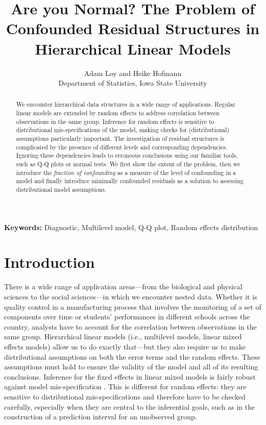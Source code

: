 \documentclass[12pt]{article} %
\title{Are you Normal? The Problem of Confounded Residual Structures in Hierarchical Linear Models}
\author{
	Adam Loy and Heike Hofmann\\
	Department of Statistics,
	Iowa State University
}
\newcommand{\hh}[1]{{\color{orange} #1}}
\newcommand{\al}[1]{{\color{red} #1}}
\begin{document}
\maketitle


\begin{abstract}
We encounter hierarchical data structures in a wide range of applications. Regular linear models are extended by random effects to address correlation between observations in the same group. Inference for random effects is sensitive to  distributional mis-specifications of the model, making checks for (distributional) assumptions particularly important.  The investigation of residual structures is complicated by the presence of  different levels and corresponding  dependencies. Ignoring these dependencies leads to  erroneous conclusions using our familiar tools, such as Q-Q plots or normal tests. We first show the extent of the problem, then we introduce the {\it fraction of confounding} as a measure of the level of confounding in a model and finally introduce minimally confounded residuals as a solution to assessing distributional model assumptions.
\end{abstract}
{\bf Keywords:} Diagnostic, Multilevel model, Q-Q plot, Random effects distribution


\section{Introduction}\label{sec:intro}
There is a wide range of application areas---from the biological and physical sciences to the social sciences---in which we encounter nested  data.
Whether it is quality control in a manufacturing process that involves the monitoring of a set of components over  time  or students' performances in different schools across the country, analysts have to account for  the correlation between observations in the same group.  Hierarchical linear models \al{(i.e., multilevel models, linear mixed effects models)} allow us to do exactly that---but they also require us to make distributional assumptions on both the error terms and the random effects. These assumptions must hold to ensure the validity of the model \hh{and all of its resulting conclusions.} 
Inference for the fixed effects in linear mixed models is fairly robust against model mis-specification \citep{Butler:1992tx, Verbeke:1997tf}. This is different for random effects: they are sensitive to  distributional mis-specifications and  therefore have to be checked carefully, especially when they are central to the inferential goals, such as in the construction of a prediction interval for an unobserved group.
\end{document}
